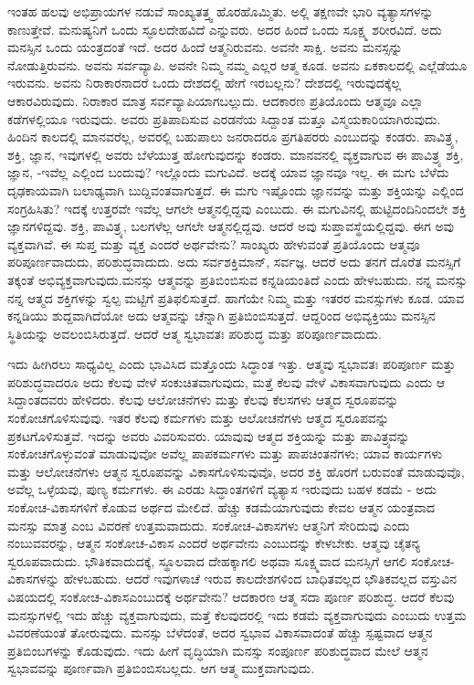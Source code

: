 ಇಂತಹ ಹಲವು ಅಭಿಪ್ರಾಯಗಳ ನಡುವೆ ಸಾಂಖ್ಯತತ್ತ್ವ ಹೊರಹೊಮ್ಮಿತು. ಅಲ್ಲಿ ತಕ್ಷಣವೇ ಭಾರಿ ವ್ಯತ್ಯಾಸಗಳನ್ನು ಕಾಣುತ್ತೇವೆ. ಮನುಷ್ಯನಿಗೆ ಒಂದು ಸ್ಫೂಲದೇಹವಿದೆ ಎನ್ನುವರು. ಅದರ ಹಿಂದೆ ಒಂದು ಸೂಕ್ಷ್ಮ ಶರೀರವಿದೆ. ಅದು ಮನಸ್ಸಿನ ಒಂದು ಯಂತ್ರದಂತೆ ಇದೆ. ಅದರ ಹಿಂದೆ ಆತ್ಮನಿರುವನು. ಅವನೇ ಸಾಕ್ಷಿ. ಅವನು ಮನಸ್ಸನ್ನು ನೋಡುತ್ತಿರುವನು. ಅವನು ಸರ್ವವ್ಯಾಪಿ. ಅವನೇ ನಿಮ್ಮ ನಮ್ಮ ಎಲ್ಲರ ಆತ್ಮ ಕೂಡ. ಅವನು ಏಕಕಾಲದಲ್ಲಿ ಎಲ್ಲೆಡೆಯೂ ಇರುವನು. ಅವನು ನಿರಾಕಾರನಾದರೆ ಒಂದು ದೇಶದಲ್ಲಿ ಹೇಗೆ ಇರಬಲ್ಲನು? ದೇಶದಲ್ಲಿ ಇರುವುದಕ್ಕೆಲ್ಲ ಆಕಾರವಿರುವುದು. ನಿರಾಕಾರ ಮಾತ್ರ ಸರ್ವವ್ಯಾಪಿಯಾಗಬಲ್ಲುದು. ಆದಕಾರಣ ಪ್ರತಿಯೊಂದು ಆತ್ಮವೂ ಎಲ್ಲಾ ಕಡೆಗಳಲ್ಲಿಯೂ ಇರುವುದು. ಅವರು ಪ್ರತಿಪಾದಿಸುವ ಎರಡನೆಯ ಸಿದ್ದಾಂತ ಮತ್ತೂ ವಿಸ್ಮಯಕಾರಿಯಾಗಿರುವುದು. ಹಿಂದಿನ ಕಾಲದಲ್ಲಿ ಮಾನವರೆಲ್ಲ, ಅವರಲ್ಲಿ ಬಹುಪಾಲು ಜನರಾದರೂ ಪ್ರಗತಿಪರರು ಎಂಬುದನ್ನು ಕಂಡರು. ಪಾವಿತ್ರ್ಯ, ಶಕ್ತಿ, ಜ್ಞಾನ, ಇವುಗಳಲ್ಲಿ ಅವರು ಬೆಳೆಯುತ್ತ ಹೋಗುವುದನ್ನು ಕಂಡರು. ಮಾನವನಲ್ಲಿ ವ್ಯಕ್ತವಾಗುವ ಈ ಪಾವಿತ್ರ್ಯ ಶಕ್ತಿ, ಜ್ಞಾನ, -ಇವೆಲ್ಲ ಎಲ್ಲಿಂದ ಬಂದುವು? ಇಲ್ಲೊಂದು ಮಗುವಿದೆ. ಅದಕ್ಕೆ ಯಾವ ಜ್ಞಾನವೂ ಇಲ್ಲ. ಈ ಮಗು ಬೆಳೆದು ದೃಢಕಾಯವಾಗಿ ಬಲಾಢ್ಯವಾಗಿ ಬುದ್ದಿವಂತವಾಗುತ್ತದೆ. ಈ ಮಗು ಇಷ್ಟೊಂದು ಜ್ಞಾನವನ್ನು ಮತ್ತು ಶಕ್ತಿಯನ್ನು ಎಲ್ಲಿಂದ ಸಂಗ್ರಹಿಸಿತು? ಇದಕ್ಕೆ ಉತ್ತರವೇ ಇವೆಲ್ಲ ಆಗಲೇ ಆತ್ಮನಲ್ಲಿದ್ದವು ಎಂಬುದು. ಈ ಮಗುವಿನಲ್ಲಿ ಹುಟ್ಟಿದಂದಿನಿಂದಲೇ ಶಕ್ತಿ ಜ್ಞಾನಗಳಿದ್ದವು. ಶಕ್ತಿ, ಪಾವಿತ್ರ್ಯ, ಬಲಗಳೆಲ್ಲ ಆಗಲೇ ಆತ್ಮನಲ್ಲಿದ್ದವು. ಆದರೆ ಅವು ಸುಪ್ತಾವಸ್ಥೆಯಲ್ಲಿದ್ದವು. ಈಗ ಅವು ವ್ಯಕ್ತವಾಗಿವೆ. ಈ ಸುಪ್ತ ಮತ್ತು ವ್ಯಕ್ತ ಎಂದರೆ ಅರ್ಥವೇನು? ಸಾಂಖ್ಯರು ಹೇಳುವಂತೆ ಪ್ರತಿಯೊಂದು ಆತ್ಮವೂ ಪರಿಪೂರ್ಣವಾದುದು, ಪರಿಶುದ್ಧವಾದುದು. ಅದು ಸರ್ವಶಕ್ತಿಮಾನ್, ಸರ್ವಜ್ಞ. ಆದರೆ ಅದು ತನಗೆ ದೊರೆತ ಮನಸ್ಸಿಗೆ ತಕ್ಕಂತೆ ಅಭಿವ್ಯಕ್ತವಾಗುವುದು.\break ಮನಸ್ಸು ಆತ್ಮವನ್ನು ಪ್ರತಿಬಿಂಬಿಸುವ ಕನ್ನಡಿಯಂತಿದೆ ಎಂದು ಹೇಳಬಹುದು. ನನ್ನ ಮನಸ್ಸು ನನ್ನ ಆತ್ಮದ ಶಕ್ತಿಗಳನ್ನು ಸ್ವಲ್ಪ ಮಟ್ಟಿಗೆ ಪ್ರತಿಫಲಿಸುತ್ತದೆ. ಹಾಗೆಯೇ ನಿಮ್ಮ ಮತ್ತು ಇತರರ ಮನಸ್ಸುಗಳು ಕೂಡ. ಯಾವ ಕನ್ನಡಿಯು ಶುದ್ದವಾಗಿದೆಯೋ ಅದು ಆತ್ಮವನ್ನು ಚೆನ್ನಾಗಿ ಪ್ರತಿಬಿಂಬಿಸುತ್ತದೆ. ಆದ್ದರಿಂದ ಅಭಿವ್ಯಕ್ತಿಯು ಮನಸ್ಸಿನ ಸ್ಥಿತಿಯನ್ನು ಅವಲಂಬಿಸಿರುತ್ತದೆ. ಆದರೆ ಆತ್ಮ ಸ್ವಭಾವತಃ ಪರಿಶುದ್ಧ ಮತ್ತು ಪರಿಪೂರ್ಣವಾದುದು.

ಇದು ಹೀಗಿರಲು ಸಾಧ್ಯವಿಲ್ಲ ಎಂದು ಭಾವಿಸಿದ ಮತ್ತೊಂದು ಸಿದ್ಧಾಂತ ಇತ್ತು. ಆತ್ಮವು ಸ್ವಭಾವತಃ ಪರಿಪೂರ್ಣ ಮತ್ತು ಪರಿಶುದ್ಧವಾದರೂ ಅದು ಕೆಲವು ವೇಳೆ ಸಂಕುಚಿತವಾಗುವುದು, ಮತ್ತೆ ಕೆಲವು ವೇಳೆ ವಿಕಾಸವಾಗುವುದು ಎಂದು ಆ ಸಿದ್ದಾಂತದವರು ಹೇಳಿದರು. ಕೆಲವು ಆಲೋಚನೆಗಳು ಮತ್ತು ಕೆಲವು ಕೆಲಸಗಳು ಆತ್ಮದ ಸ್ವರೂಪವನ್ನು ಸಂಕೋಚಗೊಳಿಸುವುವು. ಇತರ ಕೆಲವು ಕರ್ಮಗಳು ಮತ್ತು ಆಲೋಚನೆಗಳು ಆತ್ಮದ ಸ್ವರೂಪವನ್ನು ಪ್ರಕಟಗೊಳಿಸುತ್ತವೆ. ಇದನ್ನು ಅವರು ವಿವರಿಸುವರು. ಯಾವುವು ಆತ್ಮದ ಶಕ್ತಿಯನ್ನು ಮತ್ತು ಪಾವಿತ್ರ್ಯವನ್ನು ಸಂಕೋಚಗೊಳ್ಳುವಂತೆ ಮಾಡುವುವೋ ಅವೆಲ್ಲ ಪಾಪಕರ್ಮಗಳು ಮತ್ತು ಪಾಪಚಿಂತನೆಗಳು; ಯಾವ ಕಾರ್ಯಗಳು ಮತ್ತು ಆಲೋಚನೆಗಳು ಆತ್ಮನ ಸ್ವರೂಪವನ್ನು ವಿಕಾಸಗೊಳಿಸುವುವೊ, ಅದರ ಶಕ್ತಿ ಹೊರಗೆ ಬರುವಂತೆ ಮಾಡುವುವೊ, ಅವೆಲ್ಲ ಒಳ್ಳೆಯವು, ಪುಣ್ಯ ಕರ್ಮಗಳು. ಈ ಎರಡು ಸಿದ್ಧಾಂತಗಳಿಗೆ ವ್ಯತ್ಯಾಸ ಇರುವುದು ಬಹಳ ಕಡಮೆ - ಅದು ಸಂಕೋಚ-ವಿಕಾಸಗಳಿಗೆ ಕೊಡುವ ಅರ್ಥದ ಮೇಲಿದೆ. ಹೆಚ್ಚು ಕಡಮೆಯಾಗುವುದು ಕೇವಲ ಆತ್ಮನ ಯಂತ್ರವಾದ ಮನಸ್ಸು ಮಾತ್ರ ಎಂಬ ವಿವರಣೆ ಉತ್ತಮವಾದುದು. ಸಂಕೋಚ-ವಿಕಾಸಗಳು ಆತ್ಮನಿಗೆ ಸೇರಿದುವು ಎಂದು ನಂಬುವವರನ್ನು, ಆತ್ಮನ ಸಂಕೋಚ-ವಿಕಾಸ ಎಂದರೆ ಅರ್ಥವೇನು ಎಂಬುದನ್ನು ಕೇಳಬೇಕು. ಆತ್ಮವು ಚೈತನ್ಯ ಸ್ವರೂಪವಾದುದು. ಭೌತಿಕವಾದುದಕ್ಕೆ, ಸ್ಥೂಲವಾದ ದೇಹಕ್ಕಾಗಲಿ ಅಥವಾ ಸೂಕ್ಷ್ಮವಾದ ಮನಸ್ಸಿಗೆ ಆಗಲಿ ಸಂಕೋಚ-ವಿಕಾಸಗಳನ್ನು ಹೇಳಬಹುದು. ಆದರೆ ಇವುಗಳಾಚೆ ಇರುವ ಕಾಲದೇಶಗಳಿಂದ ಬಾಧಿತವಲ್ಲದ ಭೌತಿಕವಲ್ಲದ ವಸ್ತುವಿನ ವಿಷಯದಲ್ಲಿ ಸಂಕೋಚ-ವಿಕಾಸ\break ಎಂಬುದಕ್ಕೆ ಅರ್ಥವೇನು? ಆದಕಾರಣ ಆತ್ಮ ಸದಾ ಪೂರ್ಣ ಪರಿಶುದ್ಧ. ಆದರೆ ಕೆಲವು ಮನಸ್ಸುಗಳಲ್ಲಿ ಇದು ಹೆಚ್ಚು ವ್ಯಕ್ತವಾಗುವುದು, ಮತ್ತೆ ಕೆಲವುದರಲ್ಲಿ ಇದು ಕಡಮೆ ವ್ಯಕ್ತವಾಗುವುದು ಎಂಬುದು ಉತ್ತಮ ವಿವರಣೆಯಂತೆ ತೋರುವುದು. ಮನಸ್ಸು ಬೆಳೆದಂತೆ, ಅದರ ಸ್ವಭಾವ ವಿಕಾಸವಾದಂತೆ ಹೆಚ್ಚು ಸ್ಪಷ್ಟವಾದ ಆತ್ಮನ ಪ್ರತಿಬಿಂಬಗಳನ್ನು ಕೊಡುವುದು. ಇದು ಹೀಗೆ ವೃದ್ಧಿಯಾಗಿ ಮನಸ್ಸು ಸಂಪೂರ್ಣ ಪರಿಶುದ್ಧವಾದ ಮೇಲೆ ಆತ್ಮನ ಸ್ವಭಾವವನ್ನು ಪೂರ್ಣವಾಗಿ ಪ್ರತಿಬಿಂಬಿಸಬಲ್ಲದು. ಆಗ ಆತ್ಮ ಮುಕ್ತವಾಗುವುದು.

